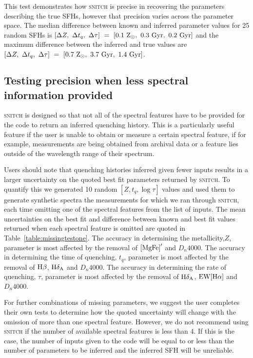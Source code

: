 \documentclass[useAMS,usenatbib]{mn2e}
\begin{document}
This test demonstrates how \textsc{snitch} is precise in recovering the parameters describing the true SFHs, however that precision varies across the parameter space. The median difference between known and inferred parameter values for 25 random SFHs is $[\Delta Z,~\Delta t_q,~\Delta \tau]~=~[0.1~\rm{Z}_{\odot},~0.3~\rm{Gyr},~0.2~\rm{Gyr}]$ and the maximum difference between the inferred and true values are $[\Delta Z,~\Delta t_q,~\Delta \tau]~=~[0.7~\rm{Z}_{\odot},~3.7~\rm{Gyr},~1.4~\rm{Gyr}]$.


\subsection{Testing precision when less spectral information provided}\label{sec:missingtest}



\textsc{snitch} is designed so that not all of the spectral features have to be provided for the code to return an inferred quenching history. This is a particularly useful feature if the user is unable to obtain or measure a certain spectral feature, if for example, measurements are being obtained from archival data or a feature lies outside of the wavelength range of their spectrum. 

Users should note that quenching histories inferred given fewer inputs results in a larger uncertainty on the quoted best fit parameters returned by \textsc{snitch}. To quantify this we generated 10 random $[Z, t_q, \log \tau]$ values and used them to generate synthetic spectra the measurements for which we ran through \textsc{snitch}, each time omitting one of the spectral features from the list of inputs. The mean uncertainties on the best fit and difference between known and best fit values returned when each spectral feature is omitted are quoted in Table~\ref{table:missingtestone}. The accuracy in determining the metallicity,$Z$, parameter is most affected by the removal of $\rm{[MgFe]}^{\prime}$ and $D_n4000$. The accuracy in determining the time of quenching, $t_q$, parameter is most affected by the removal of $\rm{H}\beta$, $\rm{H}\delta_A$ and $D_n4000$. The accuracy in determining the rate of quenching, $\tau$, parameter is most affected by the removal of $\rm{H}\delta_A$, $\rm{EW[H}\alpha]$ and $D_n4000$.

For further combinations of missing parameters, we suggest the user completes their own tests to determine how the quoted uncertainty will change with the omission of more than one spectral feature. However, we do not recommend using \textsc{snitch} if the number of available spectral features is less than $4$. If this is the case, the number of inputs given to the code will be equal to or less than the number of parameters to be inferred and the inferred SFH will be unreliable. 
\end{document}
